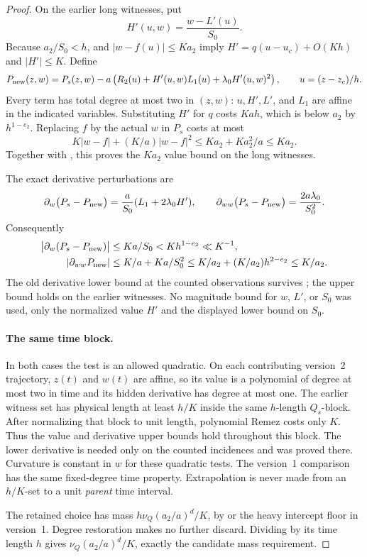 \begin{proof}
On the earlier long witnesses, put
\[
 H'(u,w)=\frac{w-L'(u)}{S_0}.
\]
Because \(a_2/S_0<h\),  and
\(|w-f(u)|\leq Ka_2\) imply
\(H'=q(u-u_c)+O(Kh)\) and \(|H'|\leq K\).
Define
\begin{equation}\label{a05:new-test}
 P_{\rm new}(z,w)
 =P_s(z,w)
   -a\left(R_2(u)+H'(u,w)L_1(u)
                         +\lambda_0H'(u,w)^2\right),
 \qquad u=(z-z_c)/h.
\end{equation}
Every term has total degree at most two in \((z,w)\):
\(u,H',L'\), and \(L_1\) are affine in the indicated variables.
Substituting \(H'\) for \(q\) costs \(Kah\), which is below
\(a_2\) by \(h^{1-e_2}\).
Replacing \(f\) by the actual \(w\) in \(P_s\) costs at most
\[
 K|w-f|+(K/a)|w-f|^2
       \leq Ka_2+Ka_2^2/a\leq Ka_2.
\]
Together with , this proves the
\(Ka_2\) value bound on the long witnesses.

The exact derivative perturbations are
\[
 \partial_w\bigl(P_s-P_{\rm new}\bigr)
       =\frac a{S_0}(L_1+2\lambda_0H'),\qquad
 \partial_{ww}\bigl(P_s-P_{\rm new}\bigr)
       =\frac{2a\lambda_0}{S_0^2}.
\]
Consequently
\begin{align}
 \bigl|\partial_w(P_s-P_{\rm new})\bigr|
   &\leq K a/S_0
     <K h^{1-e_2}\ll K^{-1},\label{a05:derivative-margin}\\
 |\partial_{ww}P_{\rm new}|
   &\leq K/a+K a/S_0^2
     \leq K/a_2+(K/a_2)h^{2-e_2}
     \leq K/a_2.\label{a05:curvature-margin}
\end{align}
The old derivative lower bound at the counted observations
survives ; the upper bound holds
on the earlier witnesses. No magnitude bound for \(w\),
\(L'\), or \(S_0\) was used, only the normalized value \(H'\)
and the displayed lower bound on \(S_0\).

\paragraph{The same time block.}
In both cases the test is an allowed quadratic.
On each contributing version~2 trajectory, \(z(t)\) and \(w(t)\)
are affine, so its value is a polynomial of degree at most two
in time and its hidden derivative has degree at most one.
The earlier witness set has physical length at least \(h/K\)
inside the same \(h\)-length \(Q_s\)-block.
After normalizing that block to unit length, polynomial Remez
costs only \(K\). Thus the value and derivative upper bounds
hold throughout this block. The lower derivative is needed
only on the counted incidences and was proved there.
Curvature is constant in \(w\) for these quadratic tests.
The version~1 comparison has the same fixed-degree time property.
Extrapolation is never made from an \(h/K\)-set to a unit
\emph{parent} time interval.

The retained choice has mass
\(h\nu_Q(a_2/a)^d/K\), by  or the heavy
intercept floor in version~1. Degree restoration makes no
further discard. Dividing by its time length \(h\) gives
\(\nu_Q(a_2/a)^d/K\), exactly the candidate mass requirement.
\end{proof}

